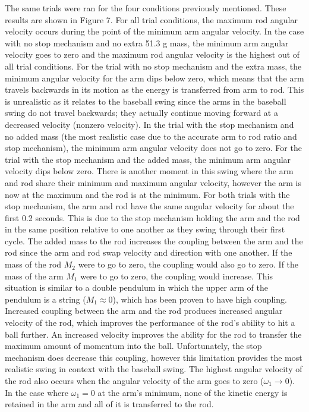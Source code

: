 \documentclass[%
 aip,
 amsmath,amssymb,
 reprint,%
 floatfix,%
]{revtex4-1}
\begin{document}
The same trials were ran for the four conditions previously mentioned. These results are shown in Figure 7. For all trial conditions, the maximum rod angular velocity occurs during the point of the minimum arm angular velocity. In the case with no stop mechanism and no extra 51.3 g mass, the minimum arm angular velocity goes to zero and the maximum rod angular velocity is the highest out of all trial conditions. For the trial with no stop mechanism and the extra mass, the minimum angular velocity for the arm dips below zero, which means that the arm travels backwards in its motion as the energy is transferred from arm to rod. This is unrealistic as it relates to the baseball swing since the arms in the baseball swing do not travel backwards; they actually continue moving forward at a decreased velocity (nonzero velocity). In the trial with the stop mechanism and no added mass (the most realistic case due to the accurate arm to rod ratio and stop mechanism), the minimum arm angular velocity does not go to zero. For the trial with the stop mechanism and the added mass, the minimum arm angular velocity dips below zero. There is another moment in this swing where the arm and rod share their minimum and maximum angular velocity, however the arm is now at the maximum and the rod is at the minimum. For both trials with the stop mechanism, the arm and rod have the same angular velocity for about the first 0.2 seconds. This is due to the stop mechanism holding the arm and the rod in the same position relative to one another as they swing through their first cycle. The added mass to the rod increases the coupling between the arm and the rod since the arm and rod swap velocity and direction with one another. If the mass of the rod $M_2$ were to go to zero, the coupling would also go to zero. If the mass of the arm $M_1$ were to go to zero, the coupling would increase. This situation is similar to a double pendulum in which the upper arm of the pendulum is a string ($M_1 \approx 0$), which has been proven to have high coupling. Increased coupling between the arm and the rod produces increased angular velocity of the rod, which improves the performance of the rod's ability to hit a ball further. An increased velocity improves the ability for the rod to transfer the maximum amount of momentum into the ball. Unfortunately, the stop mechanism does decrease this coupling, however this limitation provides the most realistic swing in context with the baseball swing. The highest angular velocity of the rod also occurs when the angular velocity of the arm goes to zero ($\omega_1 \rightarrow 0$). In the case where $\omega_1 = 0$ at the arm's minimum, none of the kinetic energy is retained in the arm and all of it is transferred to the rod.
\end{document}
